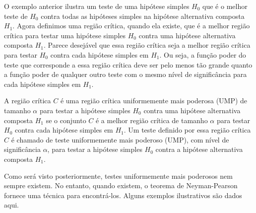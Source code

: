 \documentclass[12pt]{beamer}
\begin{document}
\begin{frame}{}
\begin{block}{}
\justifying
O exemplo anterior ilustra um teste de uma hipótese simples $H_0$ que é o melhor teste de $H_0$ contra todas as hipóteses simples na hipótese alternativa composta $H_1$. Agora definimos uma região crítica, quando ela existe, que é a melhor região crítica para testar uma hipótese simples $H_0$ contra uma hipótese alternativa composta $H_1$. Parece desejável que essa região crítica seja a melhor região crítica para testar $H_0$ contra cada hipótese simples em $H_1$. Ou seja, a função poder do teste que corresponde a essa região crítica deve ser pelo menos tão grande quanto a função poder de qualquer outro teste com o mesmo nível de significância para cada hipótese simples em $H_1$.
\end{block}
\end{frame}

\begin{frame}{}
\begin{definicao}
\justifying
A região crítica $C$ é uma região crítica uniformemente mais poderosa (UMP) de tamanho $\alpha$ para testar a hipótese simples $H_0$ contra uma hipótese alternativa composta $H_1$ se o conjunto $C$ é a melhor região crítica de tamanho $\alpha$ para testar $H_0$ contra cada hipótese simples em $H_1$. Um teste definido por essa região crítica $C$ é chamado de teste uniformemente mais poderoso (UMP), com nível de significância $\alpha$, para testar a hipótese simples $H_0$ contra a hipótese alternativa composta $H_1$.
\end{definicao}
\end{frame}

\begin{frame}{}
\begin{block}{}
\justifying
Como será visto posteriormente, testes uniformemente mais poderosos nem sempre existem. No entanto, quando existem, o teorema de Neyman-Pearson fornece uma técnica para encontrá-los. Alguns exemplos ilustrativos são dados aqui.
\end{block}
\end{frame}
\end{document}
